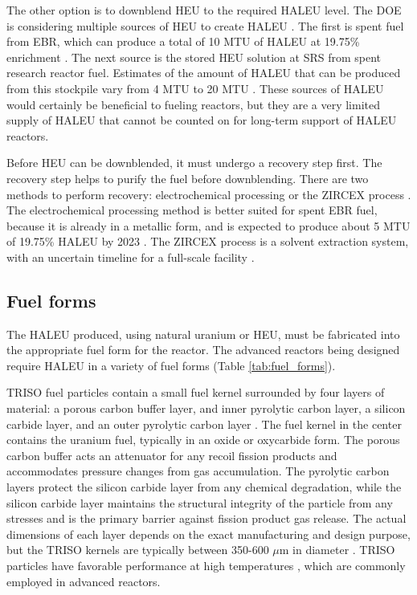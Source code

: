 The other option is to downblend \gls{HEU} to the required \gls{HALEU}
level. The \gls{DOE} is considering multiple sources of \gls{HEU} 
to create \gls{HALEU} \cite{noauthor_establishing_2022}. The 
first is spent fuel from \gls{EBR}, which can produce a total of 10 MTU 
of \gls{HALEU} at 19.75\% enrichment \cite{noauthor_establishing_2022}. 
The next source is the stored \gls{HEU} solution at \gls{SRS} from 
spent research reactor fuel. Estimates of the amount of \gls{HALEU}
that can be produced from this stockpile vary from 4 MTU 
\cite{noauthor_establishing_2022} to 20 MTU \cite{regalbuto_addressing_2020}.
These sources of 
\gls{HALEU} would certainly be beneficial to fueling reactors, but they 
are a very limited supply of \gls{HALEU} that cannot be counted on 
for long-term support of \gls{HALEU} reactors.

Before \gls{HEU} can be downblended, it must undergo a recovery step first. 
The recovery step helps to purify the fuel before downblending. There 
are two methods to perform recovery: electrochemical processing or 
the ZIRCEX process \cite{herczeg_high-assay_2019}. The electrochemical 
processing method is better suited for spent \gls{EBR} fuel, because it is 
already in a metallic form, and is expected to produce about 5 MTU of 
19.75\% \gls{HALEU} by 2023 \cite{herczeg_high-assay_2019}. The ZIRCEX 
process is a solvent extraction system, with an uncertain timeline 
for a full-scale facility \cite{herczeg_high-assay_2019}. 

\subsection{Fuel forms}
The \gls{HALEU} produced, using natural uranium or \gls{HEU}, must be 
fabricated into the appropriate fuel form for the reactor.
The advanced reactors being designed require \gls{HALEU} in a 
variety of fuel forms (Table \ref{tab:fuel_forms}).  

\gls{TRISO} fuel particles contain 
a small fuel kernel surrounded by four layers of material: a porous carbon 
buffer layer, and inner pyrolytic carbon layer, a silicon carbide layer, 
and an outer pyrolytic carbon layer \cite{demkowicz_coated_2019}. The fuel 
kernel in the center contains the uranium fuel, typically in an oxide 
or oxycarbide form. The porous carbon buffer acts an attenuator for any 
recoil fission products and accommodates pressure changes from gas 
accumulation.
The pyrolytic carbon layers protect the silicon carbide layer from 
any chemical degradation, while the silicon carbide layer maintains the 
structural integrity of the particle from any stresses and is the primary 
barrier against fission product gas release. The actual dimensions 
of each layer depends on the exact manufacturing and design purpose, but 
the \gls{TRISO} kernels are typically between 350-600 $\mu$m in diameter 
\cite{demkowicz_coated_2019}. \gls{TRISO} particles have 
favorable performance at high temperatures 
\cite{demkowicz_coated_2019}, which are commonly employed in advanced 
reactors. 

